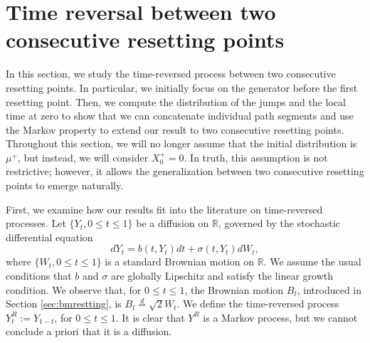\documentclass[11pt,a4paper]{article}
\theoremstyle{definition}
\theoremstyle{remark}
\begin{document}
\section{Time reversal between two consecutive resetting points}
\label{sec:paths}	
In this section, we study the time-reversed process between two consecutive resetting points. In particular, we initially focus on the generator before the first resetting point. Then, we compute the distribution of the jumps and the local time at zero to show that we can concatenate individual path segments and use the Markov property to extend our result to two consecutive resetting points. Throughout this section, we will no longer assume that the initial distribution is \(\mu^+\), but instead, we will consider \(X^+_0 = 0\). In truth, this assumption is not restrictive; however, it allows the generalization between two consecutive resetting points to emerge naturally.

First, we examine how our results fit into the literature on time-reversed processes. Let \(\{Y_t, 0 \leq t \leq 1\}\) be a diffusion on \(\mathbb{R}\), governed by the stochastic differential equation  
\[
dY_t = b(t, Y_t) dt + \sigma(t, Y_t) dW_t,
\]  
where \(\{W_t, 0 \leq t \leq 1\}\) is a standard Brownian motion on \(\mathbb{R}\). We assume the usual conditions that \( b \) and \( \sigma \) are globally Lipschitz and satisfy the linear growth condition. We observe that, for \(0 \leq t \leq 1\), the Brownian motion \(B_t\), introduced in Section \ref{sec:bmrestting}, is  \(B_t \stackrel{d}{=}\sqrt{2} W_t\). We define the time-reversed process \({Y}_t^R := Y_{1-t}\), for \(0 \leq t \leq 1\). It is clear that \({Y}^R\) is a Markov process, but we cannot conclude a priori that it is a diffusion.  
\end{document}
